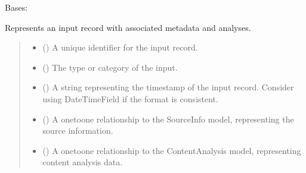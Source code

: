 \documentclass[letterpaper,10pt,english]{sphinxmanual}
\begin{document}
\begin{fulllineitems}
\label{\detokenize{source/meta_models_management:meta_models_management.models.InputRecord}}
\pysigstartsignatures
{}
\pysigstopsignatures
\sphinxAtStartPar
Bases: 

\sphinxAtStartPar
Represents an input record with associated metadata and analyses.
\begin{quote}\begin{description}
\begin{itemize}
\item {} 
\sphinxAtStartPar
{} () \textendash{} A unique identifier for the input record.

\item {} 
\sphinxAtStartPar
{} () \textendash{} The type or category of the input.

\item {} 
\sphinxAtStartPar
{} () \textendash{} A string representing the timestamp of the input record.
Consider using DateTimeField if the format is consistent.

\item {} 
\sphinxAtStartPar
{} ({\hyperref[\detokenize{source/meta_models_management:meta_models_management.models.SourceInfo}]{}}) \textendash{} A one\sphinxhyphen{}to\sphinxhyphen{}one relationship to the SourceInfo model, representing the source information.

\item {} 
\sphinxAtStartPar
{} ({\hyperref[\detokenize{source/meta_models_management:meta_models_management.models.ContentAnalysis}]{}}) \textendash{} A one\sphinxhyphen{}to\sphinxhyphen{}one relationship to the ContentAnalysis model, representing content analysis data.


\end{itemize}
\end{description}
\end{quote}
\end{fulllineitems}
\end{document}
